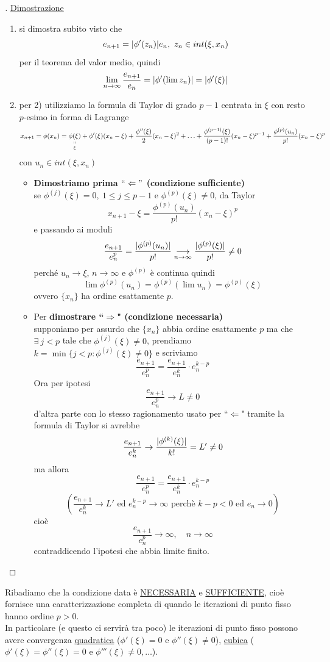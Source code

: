 \begin{proof}[\unskip\nopunct]
\uline{Dimostrazione}
\begin{enumerate}
    \item si dimostra subito visto che 
        \[e_{n+1}=\lvert\phi'(z_n)\rvert e_n, \ z_n \in int(\xi,x_n)\]
        per il teorema del valor medio, quindi 
        \[\lim_{n\to\infty} \frac{e_{n+1}}{e_n} = \lvert\phi'(\lim z_n)\rvert=\lvert\phi'(\xi)\rvert\]
    \item per 2) utilizziamo la formula di Taylor di grado $p-1$ centrata in $\xi$ con resto $p$-esimo in forma di Lagrange \\
\[x_{n+1}=\phi(x_n)=\underset{\xi}{\underset{\shortparallel}{\phi(\xi)}}+ \phi'(\xi)(x_n-\xi)+\frac{\phi''(\xi)}{2}(x_n-\xi)^2+\dotso+\frac{\phi^{(p-1)}(\xi)}{(p-1)!}(x_n-\xi)^{p-1}+\frac{\phi^{(p)}(u_n)}{p!}(x_n-\xi)^p\]
con $u_n \in int(\xi,x_n)$\\
\begin{itemize}
\item \textbf{Dimostriamo prima $``\Leftarrow"$ (condizione sufficiente)}\\
se $\phi^{(j)}(\xi)=0, \ 1\leq j \leq p-1$ e $\phi^{(p)}(\xi)\neq 0$, da Taylor 
\[x_{n+1}-\xi=\frac{\phi^{(p)}(u_n)}{p!}(x_n-\xi)^p\]
e passando ai moduli
\[\frac{e_{n+1}}{e_n^p}=\frac{\lvert\phi^{(p)}(u_n)\rvert}{p!}\underset{n\to\infty}{\longrightarrow}\frac{\lvert\phi^{(p)}(\xi)\rvert}{p!}\neq 0\]
perché $u_n\rightarrow \xi$, $n\to\infty$ e $\phi^{(p)}$ è continua quindi 
\[\lim \phi^{(p)}(u_n)=\phi^{(p)}(\lim u_n)=\phi^{(p)}(\xi)\]
ovvero $\{x_n\}$ ha ordine esattamente $p$. \\
\item Per \textbf{dimostrare ``$\Rightarrow$" (condizione necessaria)}\\ 
supponiamo per assurdo che $\{ x_n \}$ abbia ordine esattamente $p$ ma che $\exists\ j<p$ tale che $\phi^{(j)}(\xi)\neq 0 $, prendiamo $k=\min\{ j<p:\phi^{(j)}(\xi)\neq0\}$ e scriviamo 
\[\frac{e_{n+1}}{e_n^p} = \frac{e_{n+1}}{e_n^k}\cdot e_n^{k-p}\]
Ora per ipotesi
\[\frac{e_{n+1}}{e_n^p}\rightarrow L \neq 0 \]
d'altra parte con lo stesso ragionamento usato per ``$\Leftarrow$" tramite la formula di Taylor si avrebbe
\[\frac{e_{n+1}}{e_n^k}\to \frac{\lvert\phi^{(k)}(\xi)\rvert}{k!}=L'\neq 0\] 
ma allora
\[\frac{e_{n+1}}{e_n^p} = \frac{e_{n+1}}{e_n^k}\cdot e_n^{k-p}\]
\[\left( \frac{e_{n+1}}{e_n^k} \to L' \text{ ed } e_n^{k-p} \to \infty \text{ perchè } k-p<0 \text{ ed } e_n \to 0 \right) \]
cioè 
\[\frac{e_{n+1}}{e_n^p} \to \infty, \quad n \to \infty\]
contraddicendo l'ipotesi che abbia limite finito.
\end{itemize}
\end{enumerate}
\end{proof}
\bigskip
Ribadiamo che la condizione data è \uline{NECESSARIA} e \uline{SUFFICIENTE}, cioè fornisce una caratterizzazione completa di quando le iterazioni di punto fisso hanno ordine $p>0$.\\
In particolare (e questo ci servirà tra poco) le iterazioni di punto fisso possono avere convergenza \uline{quadratica} ($\phi'(\xi)=0$ e $\phi''(\xi)\ne 0$), \uline{cubica} ($\phi'(\xi)=\phi''(\xi)=0$ e $\phi'''(\xi)\ne0, \dotso$).

